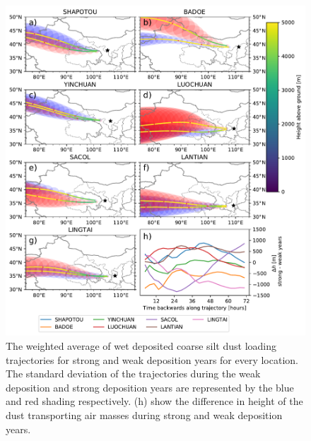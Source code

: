 \begin{figure}[htbp]
    \centering
    \includegraphics[width=\textwidth]{texfiles/figs/20_micron_wetdep_weak_strong_trajecs.pdf}
    \caption{The weighted average of wet deposited coarse silt dust loading trajectories for strong and weak deposition years for every location. The standard deviation of the trajectories during the weak deposition and strong deposition years are represented by the blue and red shading respectively.  (h) show the difference in height of the dust transporting air masses during strong and weak deposition years. }
    \label{fig:strong_weak_wetdepo_year_20mmu_trajecs}
\end{figure}


